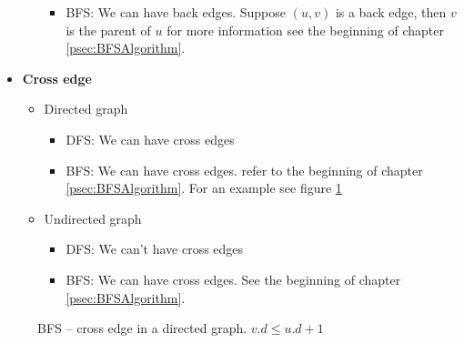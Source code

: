\documentclass{book}
\begin{document}
\begin{itemize}
\begin{itemize}
\begin{itemize}
				\item BFS: We can have back edges. Suppose $(u, v)$ is a back edge, then $v$ is the parent of $u$ for more information see the beginning of chapter \ref{psec:BFSAlgorithm}.
			\end{itemize}
		\end{itemize}
		\item \textbf{Cross edge}
		\begin{itemize}
			\item Directed graph
			\begin{itemize}
				\item DFS: We can have cross edges
				\item BFS: We can have cross edges. refer to the beginning of chapter \ref{psec:BFSAlgorithm}. For an example see figure \ref{fig:BfsCrossEdgeDirectedGraph}
			\end{itemize}
			\item Undirected graph
			\begin{itemize}
				\item DFS: We can't have cross edges
				\item BFS: We can have cross edges. See the beginning of chapter \ref{psec:BFSAlgorithm}.
			\end{itemize}
		\end{itemize}		
	\end{itemize}
	\begin{figure}[h!]
		\centering
		\caption{BFS -- cross edge in a directed graph. $v.d \le u.d + 1$}
		\label{fig:BfsCrossEdgeDirectedGraph}
	\end{figure}
	\FloatBarrier	
\end{document}
